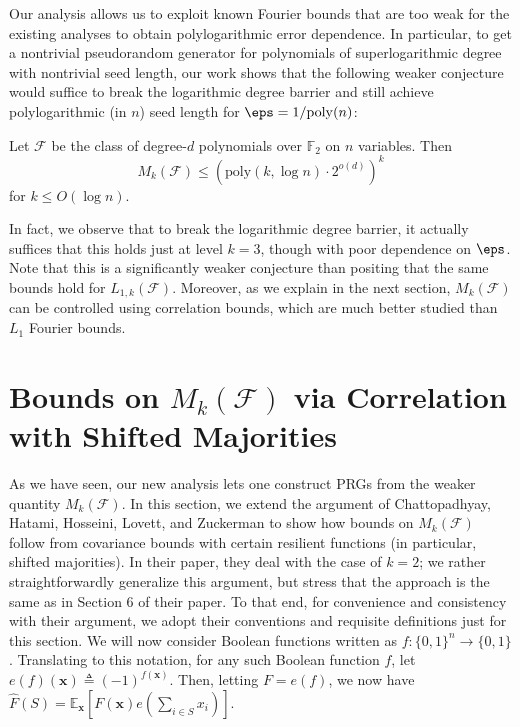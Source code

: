 Our analysis allows us to exploit known Fourier bounds that are too weak for the existing analyses to obtain polylogarithmic error dependence. In particular, to get a nontrivial pseudorandom generator for polynomials of superlogarithmic degree with nontrivial seed length, our work shows that the following weaker conjecture would suffice to break the logarithmic degree barrier and still achieve polylogarithmic (in $n$) seed length for $\eps=1/\mathrm{poly}(n)$:
\begin{conjecture}\label{con:mk}
Let $\mathcal{F}$ be the class of degree-$d$ polynomials over $\mathbb{F}_2$ on $n$ variables. Then 
\begin{equation*}
    M_{k}(\mathcal{F})\leq (\mathrm{poly}(k,\log n)\cdot 2^{o(d)})^k
\end{equation*}
for $k\leq O(\log n)$.
\end{conjecture}
In fact, we observe that to break the logarithmic degree barrier, it actually suffices that this holds just at level $k=3$, though with poor dependence on $\eps$. Note that this is a significantly weaker conjecture than positing that the same bounds hold for $L_{1,k}(\mathcal{F})$. Moreover, as we explain in the next section, $M_k(\mathcal{F})$ can be controlled using correlation bounds, which are much better studied than $L_1$ Fourier bounds.

\section{Bounds on $M_k(\mathcal{F})$ via Correlation with Shifted Majorities}
\label{sec:corrsec}
As we have seen, our new analysis lets one construct PRGs from the weaker quantity $M_k(\mathcal{F})$.  In this section, we extend the argument of Chattopadhyay, Hatami, Hosseini, Lovett, and Zuckerman \cite{xorlemma} to show how bounds on $M_k(\mathcal{F})$ follow from covariance bounds with certain resilient functions (in particular, shifted majorities). In their paper, they deal with the case of $k=2$; we rather straightforwardly generalize this argument, but stress that the approach is the same as in Section 6 of their paper. To that end, for convenience and consistency with their argument, we adopt their conventions and requisite definitions just for this section. We will now consider Boolean functions written as $f:\{0,1\}^n\to \{0,1\}$. Translating to this notation, for any such Boolean function $f$, let $e(f)(\mathbf{x})\triangleq (-1)^{f(\mathbf{x})}$. Then, letting $F=e(f)$, we now have $\hat{F}(S)=\mathbb{E}_{\mathbf{x}}[F(\mathbf{x})e(\sum_{i\in S} x_i)]$.

